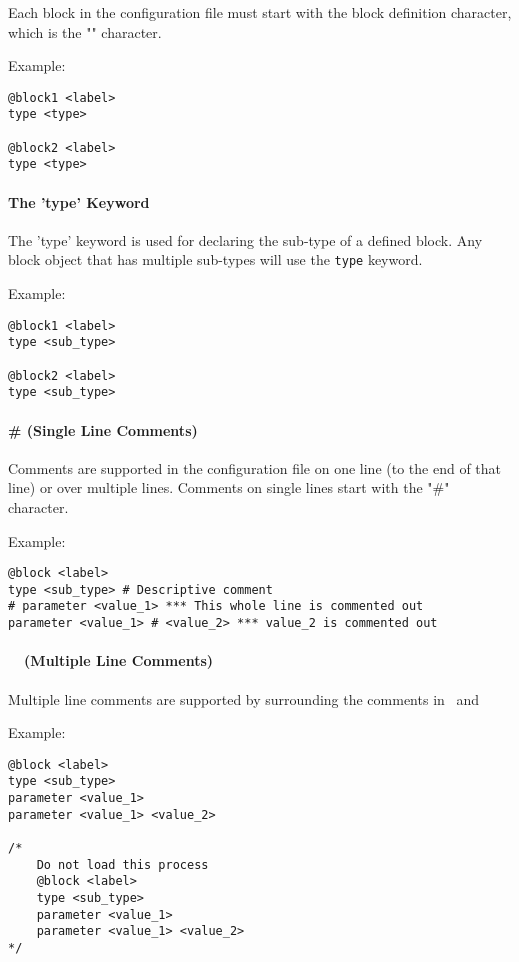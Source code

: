 Each block in the configuration file must start with the block definition character, which is the "\command" character.

Example:

{\small{\begin{verbatim}
@block1 <label>
type <type>

@block2 <label>
type <type>
\end{verbatim}}}

\paragraph*{The 'type' Keyword}

The 'type' keyword is used for declaring the sub-type of a defined block. Any block object that has multiple sub-types will use the \texttt{type} keyword.

Example:

{\small{\begin{verbatim}
@block1 <label>
type <sub_type>

@block2 <label>
type <sub_type>
\end{verbatim}}}

\paragraph*{\# (Single Line Comments)}

Comments are supported in the configuration file on one line (to the end of that line) or over multiple lines.  Comments on single lines start with the "\#" character.

Example:

{\small{\begin{verbatim}
@block <label>
type <sub_type> # Descriptive comment
# parameter <value_1> *** This whole line is commented out
parameter <value_1> # <value_2> *** value_2 is commented out
\end{verbatim}}}

\paragraph*{\commentstart\ \commentend\ (Multiple Line Comments)}

Multiple line comments are supported by surrounding the comments in \commentstart\ and \commentend

Example:

{\small{\begin{verbatim}
@block <label>
type <sub_type>
parameter <value_1>
parameter <value_1> <value_2>

/*
	Do not load this process
	@block <label>
	type <sub_type>
	parameter <value_1>
	parameter <value_1> <value_2>
*/
\end{verbatim}}}

